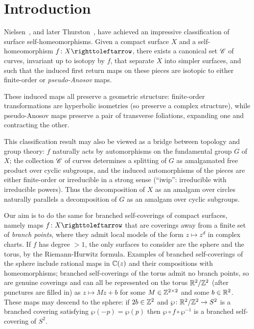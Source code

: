 \documentclass{amsart}
\begin{document}
\maketitle
\tableofcontents
\let\myboldmath=\boldmath

\setcounter{section}{-1}\section{Introduction}
Nielsen~\cite{nielsen:surfaces}, and later
Thurston~\cite{thurston:surfaces}, have achieved an impressive
classification of surface self-homeomorphisms. Given a compact surface
$X$ and a self-homeomorphism $f\colon X\selfmap$, there exists a
canonical set ${\mathscr C}$ of curves, invariant up to isotopy by $f$, that
separate $X$ into simpler surfaces, and such that the induced first
return maps on these pieces are isotopic to either finite-order or
\emph{pseudo-Anosov} maps.

These induced maps all preserve a geometric structure: finite-order
transformations are hyperbolic isometries (so preserve a complex
structure), while pseudo-Anosov maps preserve a pair of transverse
foliations, expanding one and contracting the other.

This classification result may also be viewed as a bridge between
topology and group theory: $f$ naturally acts by automorphisms on the
fundamental group $G$ of $X$; the collection ${\mathscr C}$ of curves
determines a splitting of $G$ as amalgamated free product over cyclic
subgroups, and the induced automorphisms of the pieces are either
finite-order or irreducible in a strong sense (``iwip'': irreducible
with irreducible powers). Thus the decomposition of $X$ as an amalgam
over circles naturally parallels a decomposition of $G$ as an amalgam
over cyclic subgroups.

Our aim is to do the same for branched self-coverings of compact surfaces,
namely maps $f\colon X\selfmap$ that are coverings away from a finite set
of \emph{branch points}, where they admit local models of the form
$z\mapsto z^d$ in complex charts. If $f$ has degree $>1$, the only surfaces
to consider are the sphere and the torus, by the Riemann-Hurwitz
formula. Examples of branched self-coverings of the sphere include rational
maps in ${\mathbb C}(z)$ and their compositions with homeomorphisms; branched
self-coverings of the torus admit no branch points, so are genuine
coverings and can all be represented on the torus ${\mathbb R}^2/{\mathbb Z}^2$ (after
punctures are filled in) as $z\mapsto M z+b$ for some $M\in{\mathbb Z}^{2\times2}$
and some $b\in{\mathbb R}^2$. These maps may descend to the sphere: if $2b\in{\mathbb Z}^2$
and $\wp\colon{\mathbb R}^2/{\mathbb Z}^2\to S^2$ is a branched covering satisfying
$\wp(-p)=\wp(p)$ then $\wp\circ f\circ\wp^{-1}$ is a branched self-covering
of $S^2$.
\end{document}
